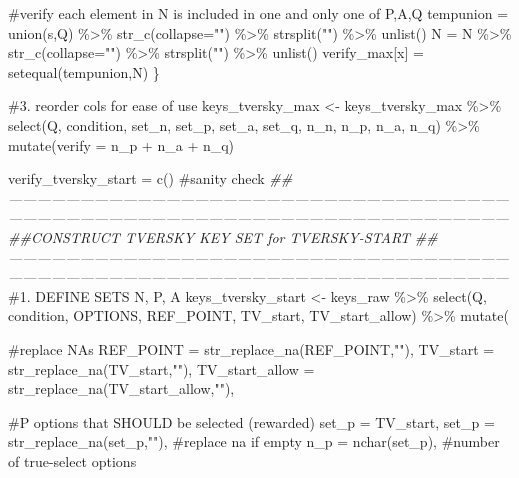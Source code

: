 \documentclass[
  letterpaper,
  DIV=11,
  numbers=noendperiod]{scrreprt}
\newenvironment{Shaded}{\begin{snugshade}}{\end{snugshade}}
\newcommand{\AttributeTok}[1]{\textcolor[rgb]{0.40,0.45,0.13}{#1}}
\newcommand{\CommentTok}[1]{\textcolor[rgb]{0.37,0.37,0.37}{#1}}
\newcommand{\DocumentationTok}[1]{\textcolor[rgb]{0.37,0.37,0.37}{\textit{#1}}}
\newcommand{\FunctionTok}[1]{\textcolor[rgb]{0.28,0.35,0.67}{#1}}
\newcommand{\NormalTok}[1]{\textcolor[rgb]{0.00,0.23,0.31}{#1}}
\newcommand{\OtherTok}[1]{\textcolor[rgb]{0.00,0.23,0.31}{#1}}
\newcommand{\SpecialCharTok}[1]{\textcolor[rgb]{0.37,0.37,0.37}{#1}}
\newcommand{\StringTok}[1]{\textcolor[rgb]{0.13,0.47,0.30}{#1}}
\begin{document}
\begin{Shaded}
\begin{Highlighting}[]
  \CommentTok{\#verify each element in N is included in one and only one of P,A,Q}
\NormalTok{  tempunion }\OtherTok{=} \FunctionTok{union}\NormalTok{(s,Q) }\SpecialCharTok{\%\textgreater{}\%} \FunctionTok{str\_c}\NormalTok{(}\AttributeTok{collapse=}\StringTok{""}\NormalTok{) }\SpecialCharTok{\%\textgreater{}\%} \FunctionTok{strsplit}\NormalTok{(}\StringTok{""}\NormalTok{) }\SpecialCharTok{\%\textgreater{}\%} \FunctionTok{unlist}\NormalTok{()}
\NormalTok{  N }\OtherTok{=}\NormalTok{ N }\SpecialCharTok{\%\textgreater{}\%} \FunctionTok{str\_c}\NormalTok{(}\AttributeTok{collapse=}\StringTok{""}\NormalTok{) }\SpecialCharTok{\%\textgreater{}\%} \FunctionTok{strsplit}\NormalTok{(}\StringTok{""}\NormalTok{) }\SpecialCharTok{\%\textgreater{}\%} \FunctionTok{unlist}\NormalTok{()}
\NormalTok{  verify\_max[x] }\OtherTok{=} \FunctionTok{setequal}\NormalTok{(tempunion,N)}
\NormalTok{\}}

\CommentTok{\#3. reorder cols for ease of use}
\NormalTok{keys\_tversky\_max }\OtherTok{\textless{}{-}}\NormalTok{ keys\_tversky\_max }\SpecialCharTok{\%\textgreater{}\%} \FunctionTok{select}\NormalTok{(Q, condition, set\_n, set\_p, set\_a, set\_q, n\_n, n\_p, n\_a, n\_q) }\SpecialCharTok{\%\textgreater{}\%} \FunctionTok{mutate}\NormalTok{(}\AttributeTok{verify =}\NormalTok{ n\_p }\SpecialCharTok{+}\NormalTok{ n\_a }\SpecialCharTok{+}\NormalTok{ n\_q)}

\NormalTok{verify\_tversky\_start }\OtherTok{=} \FunctionTok{c}\NormalTok{() }\CommentTok{\#sanity check}
\DocumentationTok{\#\#——————————————————————————————————————————————————————————————————————}
\DocumentationTok{\#\#CONSTRUCT TVERSKY KEY SET for TVERSKY{-}START}
\DocumentationTok{\#\#——————————————————————————————————————————————————————————————————————}
\CommentTok{\#1. DEFINE SETS N, P, A}
\NormalTok{keys\_tversky\_start }\OtherTok{\textless{}{-}}\NormalTok{ keys\_raw }\SpecialCharTok{\%\textgreater{}\%} 
  \FunctionTok{select}\NormalTok{(Q, condition, OPTIONS, REF\_POINT, TV\_start, TV\_start\_allow) }\SpecialCharTok{\%\textgreater{}\%} 
  \FunctionTok{mutate}\NormalTok{(}
  
    \CommentTok{\#replace NAs }
    \AttributeTok{REF\_POINT =} \FunctionTok{str\_replace\_na}\NormalTok{(REF\_POINT,}\StringTok{""}\NormalTok{),}
    \AttributeTok{TV\_start =} \FunctionTok{str\_replace\_na}\NormalTok{(TV\_start,}\StringTok{""}\NormalTok{),}
    \AttributeTok{TV\_start\_allow =} \FunctionTok{str\_replace\_na}\NormalTok{(TV\_start\_allow,}\StringTok{""}\NormalTok{),}
    
    \CommentTok{\#P options that SHOULD be selected (rewarded)}
    \AttributeTok{set\_p =}\NormalTok{ TV\_start,}
    \AttributeTok{set\_p =} \FunctionTok{str\_replace\_na}\NormalTok{(set\_p,}\StringTok{""}\NormalTok{), }\CommentTok{\#replace na if empty}
    \AttributeTok{n\_p =} \FunctionTok{nchar}\NormalTok{(set\_p), }\CommentTok{\#number of true{-}select options}
    

\end{Highlighting}
\end{Shaded}
\end{document}
